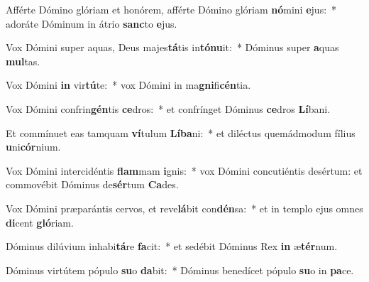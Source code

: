 \item Afférte Dómino glóriam et honórem, afférte Dómino glóriam \textbf{nó}mini \textbf{e}jus:~* adoráte Dóminum in átrio \textbf{sanc}to \textbf{e}jus.
\item Vox Dómini super aquas, Deus majes\textbf{tá}tis in\textbf{tó}\textbf{nu}it:~* Dóminus super \textbf{a}quas \textbf{mul}tas.
\item Vox Dómini \textbf{in} vir\textbf{tú}te:~* vox Dómini in ma\textbf{gni}fi\textbf{cén}tia.
\item Vox Dómini confrin\textbf{gén}tis \textbf{ce}dros:~* et confrínget Dóminus \textbf{ce}dros \textbf{Lí}bani.
\item Et commínuet eas tamquam \textbf{ví}tulum \textbf{Lí}\textbf{ba}ni:~* et diléctus quemádmodum fílius \textbf{u}ni\textbf{cór}nium.
\item Vox Dómini intercidéntis \textbf{flam}mam \textbf{i}gnis:~* vox Dómini concutiéntis desértum: et commovébit Dóminus de\textbf{sér}tum \textbf{Ca}des.
\item Vox Dómini præparántis cervos, et reve\textbf{lá}bit con\textbf{dén}sa:~* et in templo ejus omnes \textbf{di}cent \textbf{gló}riam.
\item Dóminus dilúvium inhabi\textbf{tá}re \textbf{fa}cit:~* et sedébit Dóminus Rex \textbf{in} æ\textbf{tér}num.
\item Dóminus virtútem pópulo \textbf{su}o \textbf{da}bit:~* Dóminus benedícet pópulo \textbf{su}o in \textbf{pa}ce.

